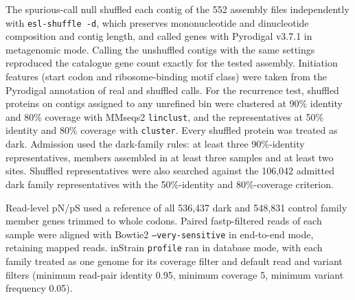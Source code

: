 The spurious-call null shuffled each contig of the 552 assembly files independently with \texttt{esl-shuffle -d}, which preserves mononucleotide and dinucleotide composition and contig length, and called genes with Pyrodigal v3.7.1 in metagenomic mode. Calling the unshuffled contigs with the same settings reproduced the catalogue gene count exactly for the tested assembly. Initiation features (start codon and ribosome-binding motif class) were taken from the Pyrodigal annotation of real and shuffled calls. For the recurrence test, shuffled proteins on contigs assigned to any unrefined bin were clustered at 90\% identity and 80\% coverage with MMseqs2 \texttt{linclust}, and the representatives at 50\% identity and 80\% coverage with \texttt{cluster}. Every shuffled protein was treated as dark. Admission used the dark-family rules: at least three 90\%-identity representatives, members assembled in at least three samples and at least two sites. Shuffled representatives were also searched against the 106,042 admitted dark family representatives with the 50\%-identity and 80\%-coverage criterion.

Read-level pN/pS used a reference of all 536,437 dark and 548,831 control family member genes trimmed to whole codons. Paired fastp-filtered reads of each sample were aligned with Bowtie2 \texttt{--very-sensitive} in end-to-end mode, retaining mapped reads. inStrain \texttt{profile} ran in database mode, with each family treated as one genome for its coverage filter and default read and variant filters (minimum read-pair identity 0.95, minimum coverage 5, minimum variant frequency 0.05).


